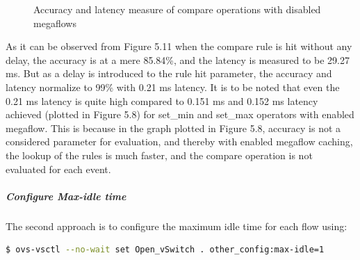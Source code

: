 \begin{figure}[H]  
 
 \caption{Accuracy and latency measure of compare operations with disabled megaflows}
 \hfil{}
\end{figure}


As it can be observed from Figure 5.11 when the compare rule is hit without any delay, the accuracy is at a mere 85.84\%, and the latency is measured to be 29.27 ms. But as a delay is introduced to the rule hit parameter, the accuracy and latency normalize to 99\% with 0.21 ms latency. It is to be noted that even the 0.21 ms latency is quite high compared to 0.151 ms and 0.152 ms latency achieved (plotted in Figure 5.8) for set_min and set_max operators with enabled megaflow. This is because in the graph plotted in Figure 5.8, accuracy is not a considered parameter for evaluation, and thereby with enabled megaflow caching, the lookup of the rules is much faster, and the compare operation is not evaluated for each event. 

\subparagraph*{Configure Max-idle time}
The second approach is to configure the maximum idle time for each flow using:

 \begin{lstlisting}[language=bash]
$ ovs-vsctl --no-wait set Open_vSwitch . other_config:max-idle=1 \end{lstlisting}

